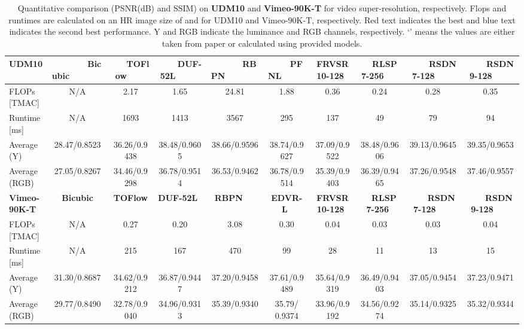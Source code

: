 \begin{table}[t]
	\centering
	\scalebox{0.42}
	{	
		\begin{tabular}{l||c|c|c|c|c||c|c||c|c}
			\hline   \hline  	
			\textbf{UDM10} &~~~~~~~\textbf{Bicubic}~~~~~~~  &~~~\textbf{TOFlow}~\cite{xue2019video}~~~ &~~~~\textbf{DUF-52L}~\cite{jo2018deep}~~~~   &~~~~~~\textbf{RBPN}~\cite{haris2019recurrent}~~~~~~ &~~~~\textbf{PFNL}~\cite{yi2019progressive}~~~~ &\textbf{FRVSR 10-128}~\cite{sajjadi2018frame} &~~\textbf{RLSP 7-256}~\cite{Fuoli-arxiv19-rlsp}~~&~~~~\textbf{RSDN 7-128}~~~~  &~~~~\textbf{RSDN 9-128}~~~~ 
			\\\hline
			FLOPs  [TMAC]   &N/A &2.17 &1.65 &24.81 &1.88  &0.36 &0.24 &0.28 &0.35 
			\\
			Runtime [ms]  &N/A &1693 &1413 &3567 &295  &137 &49 &79 &94
			\\ 
			Average (Y) &28.47/0.8523 &36.26/0.9438 &38.48/0.9605 &38.66/0.9596 &38.74/0.9627 &37.09/0.9522  &38.48/0.9606 &{\color{blue}39.13}/{\color{blue}0.9645} &{\color{red}39.35}/{\color{red}0.9653}
			\\
			Average (RGB)  &27.05/0.8267 &34.46/0.9298  &36.78/0.9514 &36.53/0.9462 &36.78/0.9514 &35.39/0.9403 &36.39/0.9465 &{\color{blue}37.26}/{\color{blue}0.9548} &{\color{red}37.46}/{\color{red}0.9557}
			\\ \hline  \hline
			\textbf{Vimeo-90K-T} &\textbf{Bicubic} &\textbf{TOFlow}~\cite{xue2019video} &\textbf{DUF-52L}~\cite{jo2018deep}  &\textbf{RBPN}~\cite{haris2019recurrent}~~ &\textbf{EDVR-L}~\cite{wang2019edvr}  &\textbf{FRVSR 10-128}~\cite{sajjadi2018frame} &~~\textbf{RLSP 7-256}~\cite{Fuoli-arxiv19-rlsp} &~~~~\textbf{RSDN 7-128}~~~~  &~~~~\textbf{RSDN 9-128}~~~~
			\\ \hline 
			FLOPs [TMAC]  &N/A &0.27 &0.20 &3.08 &0.30  &0.04 &0.03 &0.03 &0.04
			\\
			Runtime [ms] &N/A &215 &167 &470 &99 &28 &11 &13 &15
			\\ 
			Average (Y)  &31.30/0.8687 &34.62/0.9212   &36.87/0.9447 &37.20/0.9458  & {\color{red} 37.61}/{\color{red}0.9489}  &35.64/0.9319   &36.49/0.9403 & 37.05/0.9454 &{\color{blue}37.23}/{\color{blue}0.9471}
			\\
			Average (RGB) &29.77/0.8490 &32.78/0.9040  &34.96/0.9313 &{\color{blue}35.39}/0.9340 &{\color{red} 35.79}/{\color{red} 0.9374} &33.96/0.9192  & 34.56/0.9274 &35.14/0.9325 &35.32/{\color{blue}0.9344}
			\\ \hline
		\end{tabular}
	}
	\vspace{3mm}
	\caption{Quantitative comparison (PSNR(dB) and SSIM) on \textbf{UDM10} and \textbf{Vimeo-90K-T} for  video super-resolution, respectively. Flops and runtimes are calculated on an HR image size of  and  for UDM10 and Vimeo-90K-T, respectively. {\color{red}Red} text indicates the best and {\color{blue} blue} text indicates the second best performance. Y and RGB indicate the luminance and RGB channels, respectively. `' means the values are either taken from paper or calculated using provided models. } \label{SPMC_table}
	\vspace{-5mm}
\end{table}

